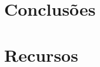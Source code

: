 \documentclass[a4paper]{article}
\begin{document}
\newpage


\section{Conclusões}

\newpage


\section{Recursos}

\newpage
\end{document}
